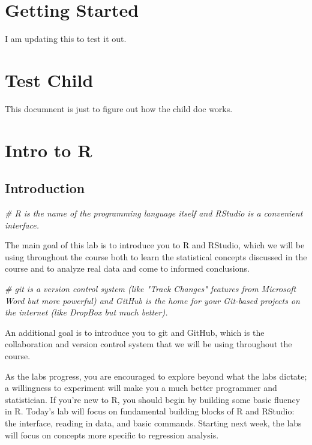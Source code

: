 \documentclass[]{book}
\newenvironment{Shaded}{\begin{snugshade}}{\end{snugshade}}
\newcommand{\CommentTok}[1]{\textcolor[rgb]{0.56,0.35,0.01}{\textit{#1}}}
\begin{document}
\chapter{Getting Started}\label{getstarted}

I am updating this to test it out.

\chapter{Test Child}\label{test-child}

This documnent is just to figure out how the child doc works.

\chapter{Intro to R}\label{intro-to-r}

\section{Introduction}\label{introduction-1}

\begin{Shaded}
\begin{Highlighting}[]
\CommentTok{# R is the name of the programming language itself and RStudio is a convenient interface.}
\end{Highlighting}
\end{Shaded}

The main goal of this lab is to introduce you to R and RStudio, which we
will be using throughout the course both to learn the statistical
concepts discussed in the course and to analyze real data and come to
informed conclusions.

\begin{Shaded}
\begin{Highlighting}[]
\CommentTok{# git is a version control system (like "Track Changes" features from Microsoft Word but more powerful) and GitHub is the home for your Git-based projects on the internet (like DropBox but much better).}
\end{Highlighting}
\end{Shaded}

An additional goal is to introduce you to git and GitHub, which is the
collaboration and version control system that we will be using
throughout the course.

As the labs progress, you are encouraged to explore beyond what the labs
dictate; a willingness to experiment will make you a much better
programmer and statistician. If you're new to R, you should begin by
building some basic fluency in R. Today's lab will focus on fundamental
building blocks of R and RStudio: the interface, reading in data, and
basic commands. Starting next week, the labs will focus on concepts more
specific to regression analysis.
\end{document}
